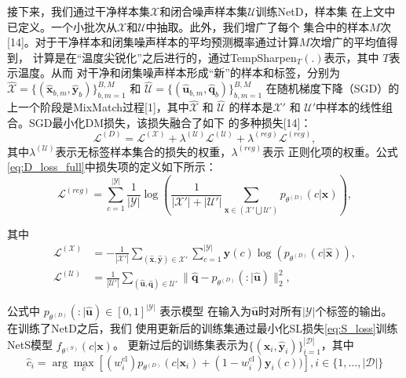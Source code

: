 \documentclass[11pt]{article}
\begin{document}
接下来，我们通过干净样本集$\mathcal{X}$和闭合噪声样本集$\mathcal{U}$训练NetD，样本集
在上文中已定义。一个小批次从$\mathcal{X}$和$\mathcal{U}$中抽取。此外，我们增广了每个
集合中的样本$M$次[14]。对于干净样本和闭集噪声样本的平均预测概率通过计算$M$次增广的平均值得到，
计算是在“温度尖锐化”之后进行的，通过TempSharpen$_T(.)$表示，其中 $T$表示温度。从而
对干净和闭集噪声样本形成“新”的样本和标签，分别为
$\hat{\mathcal{X}} = \{ (\hat{\mathbf{x}}_{b,m},\hat{\mathbf{y}}_b)\}_{b,m=1}^{B,M}$ 和
$\hat{\mathcal{U}} = \{ (\hat{\mathbf{u}}_{b,m},\hat{\mathbf{q}}_b)\}_{b,m=1}^{B,M}$
在随机梯度下降（SGD）的上一个阶段是MixMatch过程[1]，其中$\hat{\mathcal{X}}$ 和 $\hat{\mathcal{U}}$
的样本是$\mathcal{X}'$ 和 $\mathcal{U}'$中样本的线性组合。SGD最小化DM损失，该损失融合了如下
的多种损失[14]：
\begin{equation}
    \mathcal{L}^{(D)} = \mathcal{L}^{(\mathcal{X})} + \lambda^{(\mathcal{U})}\mathcal{L}^{(\mathcal{U})} + \lambda^{(reg)}\mathcal{L}^{(reg)},
    \label{eq:D_loss_full}
\end{equation}
其中$\lambda^{(\mathcal{U})}$表示无标签样本集合的损失的权重，$\lambda^{(reg)}$表示
正则化项的权重。公式\eqref{eq:D_loss_full}中损失项的定义如下所示：
\begin{equation}
    \mathcal{L}^{(reg)} = \sum_{c=1}^{|\mathcal{Y}|} \frac{1}{|\mathcal{Y}|} \log \left ( \frac{1}{|\mathcal{X}'| + |\mathcal{U}'|} \sum_{\mathbf{x} \in (\mathcal{X}' \bigcup \mathcal{U}')} p_{\theta^{(D)}}(c|\mathbf{x}) \right ),
    \label{eq:L_reg}
\end{equation}

其中
\begin{equation}
    \begin{split}
        \mathcal{L}^{(\mathcal{X})} &= -\frac{1}{|\mathcal{X}'|} \sum_{(\hat{\mathbf{x}},\hat{\mathbf{y}})\in \mathcal{X}'} \sum_{c=1}^{|\mathcal{Y}|} \hat{\mathbf{y}}(c) \log(p_{\theta^{(D)}}(c | \hat{\mathbf{x}}) ), \\
        \mathcal{L}^{(\mathcal{U})} &= \frac{1}{|\mathcal{U}'|} \sum_{(\hat{\mathbf{u}},\hat{\mathbf{q}}) \in \mathcal{U}'} \| \hat{\mathbf{q}} - p_{\theta^{(D)}}(: | \hat{\mathbf{u}}) \|_2^2,
    \end{split}
    \label{eq:L_X_L_U}
\end{equation}

公式中 $p_{\theta^{(D)}}(: | \hat{\mathbf{u}}) \in [0,1]^{|\mathcal{Y}|}$ 表示模型
在输入为$\hat{\mathbf{u}}$时对所有$|\mathcal{Y}|$个标签的输出。在训练了NetD之后，我们
使用更新后的训练集通过最小化SL损失\eqref{eq:S_loss}训练NetS模型 $f_{\theta^{(S)}}(c|\mathbf{x})$。
更新过后的训练集表示为$\{ (\mathbf{x}_i,\hat{\mathbf{y}}_i)\}_{i=1}^{|\mathcal{D}|}$，其中
\begin{equation}
    \hat{c}_i = \arg\max_c \left [ (w_i^{\text{cl}}) p_{\theta^{(D)}}(c|\mathbf{x}_i) +
                (1-w_i^{\text{cl}}) \mathbf{y}_i(c)) \right ],  i \in \{1,...,|\mathcal{D}|\}
                \nonumber
\end{equation}
\end{document}
